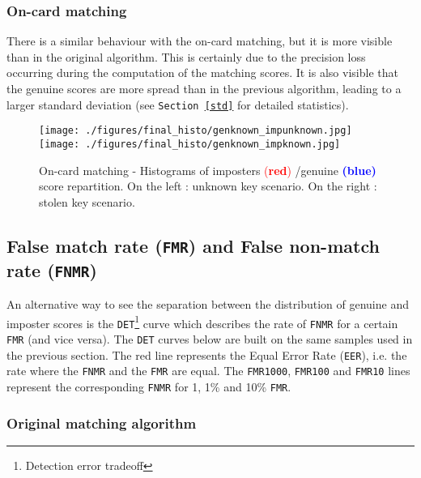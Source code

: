 \documentclass[a4paper,12pt]{article}
\begin{document}
\subsubsection{On-card matching}
There is a similar behaviour with the on-card matching, but it is more visible than in the original algorithm. This is certainly due to the precision loss occurring during the computation of the matching scores. It is also visible that the genuine scores are more spread than in the previous algorithm, leading to a larger standard deviation (see \texttt{Section \ref{std}} for detailed statistics).
\begin{figure}[!htbp]
\centering
 \texttt{[image: ./figures/final\_histo/genknown\_impunknown.jpg]}\texttt{[image: ./figures/final\_histo/genknown\_impknown.jpg]}\\

\caption{On-card matching - Histograms of imposters \textcolor{red}{(\textbf{red})} /genuine \textcolor{blue}{\textbf{(blue)}} score repartition.
On the left : unknown key scenario.
On the right : stolen key scenario.}
\label{tab:mcc_eer}
\end{figure}

\subsection{False match rate (\texttt{FMR}) and False non-match rate (\texttt{FNMR})}
An alternative way to see the separation between the distribution of genuine and imposter scores is the \texttt{DET}\footnote{Detection error tradeoff} curve which describes the rate of \texttt{FNMR} for a certain \texttt{FMR} (and vice versa). The \texttt{DET} curves below are built on the same samples used in the previous section. The red line represents the Equal Error Rate (\texttt{EER}), i.e. the rate where the \texttt{FNMR} and the \texttt{FMR} are equal. The \texttt{FMR1000}, \texttt{FMR100} and \texttt{FMR10} lines represent the corresponding \texttt{FNMR} for 1\textperthousand, 1\% and 10\% \texttt{FMR}.
\subsubsection{Original matching algorithm}
\end{document}
